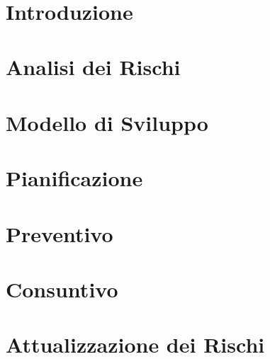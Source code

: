 \documentclass[12pt, a4paper,table]{article}
\title{\textsc{\docNome}}
\author{}
\date{}
\begin{document}


\tableofcontents
\newpage
\section{Introduzione}
    
\section{Analisi dei Rischi}
      
\section{Modello di Sviluppo}
      
\section{Pianificazione}
      
      
      
      
\section{Preventivo}
      
      
      
\section{Consuntivo}
      
      
      \newpage
\section{Attualizzazione dei Rischi}
      
\end{document}
